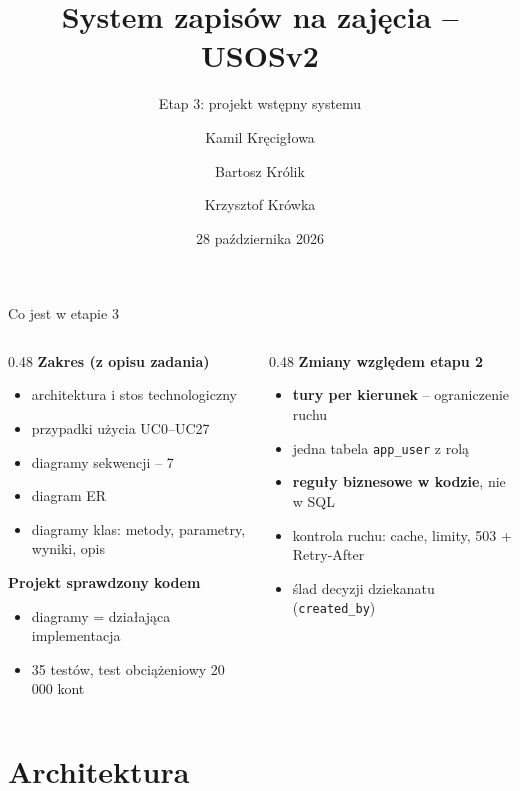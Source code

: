 \documentclass[aspectratio=169,11pt]{beamer}
\title{System zapisów na zajęcia -- USOSv2}
\subtitle{Etap 3: projekt wstępny systemu}
\author{Kamil Kręcigłowa \and Bartosz Królik \and Krzysztof Krówka}
\institute{Inżynieria Oprogramowania, zima 2026/2027}
\date{28 października 2026}
\begin{document}
\maketitle

\begin{frame}{Co jest w etapie 3}
  \begin{columns}[T]
    \begin{column}{0.48\textwidth}
      \textbf{Zakres (z opisu zadania)}
      \begin{itemize}\small
        \item architektura i stos technologiczny
        \item przypadki użycia UC0--UC27
        \item diagramy sekwencji -- 7
        \item diagram ER
        \item diagramy klas: metody, parametry, wyniki, opis
      \end{itemize}
      \textbf{Projekt sprawdzony kodem}
      \begin{itemize}\small
        \item diagramy = działająca implementacja
        \item 35 testów, test obciążeniowy 20\,000 kont
      \end{itemize}
    \end{column}
    \begin{column}{0.48\textwidth}
      \textbf{Zmiany względem etapu 2}
      \begin{itemize}\small
        \item \textbf{tury per kierunek} -- ograniczenie ruchu
        \item jedna tabela \texttt{app\_user} z rolą
        \item \textbf{reguły biznesowe w kodzie}, nie w SQL
        \item kontrola ruchu: cache, limity, 503 + Retry-After
        \item ślad decyzji dziekanatu (\texttt{created\_by})
      \end{itemize}
    \end{column}
  \end{columns}
\end{frame}

\section{Architektura}
\end{document}

